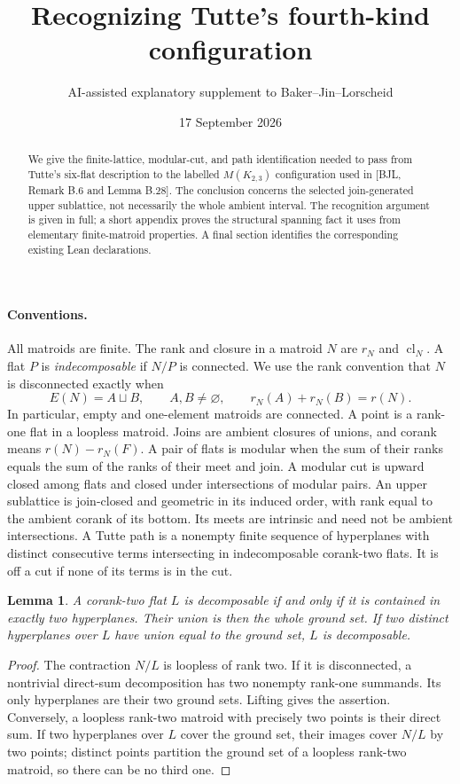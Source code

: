 \documentclass[11pt]{article}
\title{Recognizing Tutte's fourth-kind configuration}
\author{AI-assisted explanatory supplement to Baker--Jin--Lorscheid}
\date{17 September 2026}
\newtheorem{lemma}{Lemma}
\DeclareMathOperator{\cl}{cl}
\begin{document}
\maketitle
\begin{abstract}
We give the finite-lattice, modular-cut, and path identification needed to pass from Tutte's six-flat description to the labelled $M(K_{2,3})$ configuration used in [BJL, Remark B.6 and Lemma B.28]. The conclusion concerns the selected join-generated upper sublattice, not necessarily the whole ambient interval. The recognition argument is given in full; a short appendix proves the structural spanning fact it uses from elementary finite-matroid properties. A final section identifies the corresponding existing Lean declarations.
\end{abstract}

\paragraph{Conventions.}
All matroids are finite. The rank and closure in a matroid $N$ are $r_N$ and $\cl_N$. A flat $P$ is \emph{indecomposable} if $N/P$ is connected. We use the rank convention that $N$ is disconnected exactly when
\[
 E(N)=A\sqcup B,\qquad A,B\ne\varnothing,\qquad
 r_N(A)+r_N(B)=r(N).
\]
In particular, empty and one-element matroids are connected. A point is a rank-one flat in a loopless matroid. Joins are ambient closures of unions, and corank means $r(N)-r_N(F)$. A pair of flats is modular when the sum of their ranks equals the sum of the ranks of their meet and join. A modular cut is upward closed among flats and closed under intersections of modular pairs. An upper sublattice is join-closed and geometric in its induced order, with rank equal to the ambient corank of its bottom. Its meets are intrinsic and need not be ambient intersections. A Tutte path is a nonempty finite sequence of hyperplanes with distinct consecutive terms intersecting in indecomposable corank-two flats. It is off a cut if none of its terms is in the cut.

\begin{lemma}\label{lem:two}
A corank-two flat $L$ is decomposable if and only if it is contained in exactly two hyperplanes. Their union is then the whole ground set. If two distinct hyperplanes over $L$ have union equal to the ground set, $L$ is decomposable.
\end{lemma}
\begin{proof}
The contraction $N/L$ is loopless of rank two. If it is disconnected, a nontrivial direct-sum decomposition has two nonempty rank-one summands. Its only hyperplanes are their two ground sets. Lifting gives the assertion. Conversely, a loopless rank-two matroid with precisely two points is their direct sum. If two hyperplanes over $L$ cover the ground set, their images cover $N/L$ by two points; distinct points partition the ground set of a loopless rank-two matroid, so there can be no third one.
\end{proof}
\end{document}
